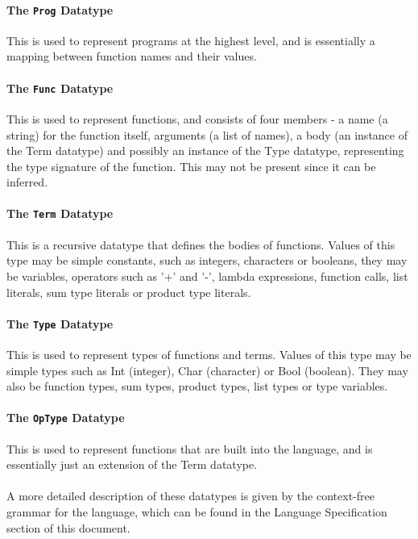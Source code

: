 \documentclass{article}
\begin{document}
\paragraph{The \texttt{Prog} Datatype \\}
This is used to represent programs at the highest level, and is essentially a mapping between function names and their values.
\paragraph{The \texttt{Func} Datatype \\}
This is used to represent functions, and consists of four members - a name (a string) for the function itself, arguments (a list of names), a body (an instance of the Term datatype) and possibly an instance of the Type datatype, representing the type signature of the function. This may not be present since it can be inferred.
\paragraph{The \texttt{Term} Datatype \\}
This is a recursive datatype that defines the bodies of functions. Values of this type may be simple constants, such as integers, characters or booleans, they may be variables, operators such as '+' and '-', lambda expressions, function calls, list literals, sum type literals or product type literals.
\paragraph{The \texttt{Type} Datatype \\}
This is used to represent types of functions and terms. Values of this type may be simple types such as Int (integer), Char (character) or Bool (boolean). They may also be function types, sum types, product types, list types or type variables.
\paragraph{The \texttt{OpType} Datatype \\}
This is used to represent functions that are built into the language, and is essentially just an extension of the Term datatype.
\\\\ A more detailed description of these datatypes is given by the context-free grammar for the language, which can be found in the Language Specification section of this document.
\end{document}
